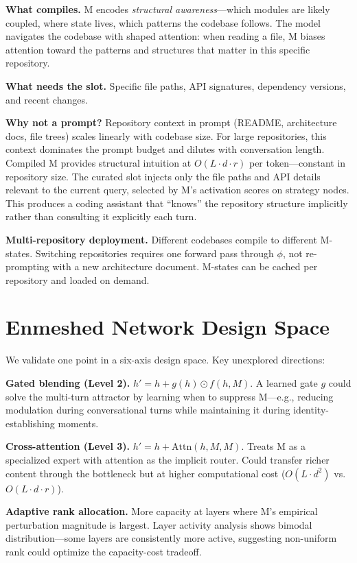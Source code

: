 \textbf{What compiles.} M encodes \emph{structural awareness}---which modules are likely coupled, where state lives, which patterns the codebase follows. The model navigates the codebase with shaped attention: when reading a file, M biases attention toward the patterns and structures that matter in this specific repository.

\textbf{What needs the slot.} Specific file paths, API signatures, dependency versions, and recent changes.

\textbf{Why not a prompt?} Repository context in prompt (README, architecture docs, file trees) scales linearly with codebase size. For large repositories, this context dominates the prompt budget and dilutes with conversation length. Compiled M provides structural intuition at $O(L \cdot d \cdot r)$ per token---constant in repository size. The curated slot injects only the file paths and API details relevant to the current query, selected by M's activation scores on strategy nodes. This produces a coding assistant that ``knows'' the repository structure implicitly rather than consulting it explicitly each turn.

\textbf{Multi-repository deployment.} Different codebases compile to different M-states. Switching repositories requires one forward pass through $\phi$, not re-prompting with a new architecture document. M-states can be cached per repository and loaded on demand.

\section{Enmeshed Network Design Space}
\label{sec:full_design_space}

We validate one point in a six-axis design space. Key unexplored directions:

\textbf{Gated blending (Level 2).} $h' = h + g(h) \odot f(h, M)$. A learned gate $g$ could solve the multi-turn attractor by learning when to suppress M---e.g., reducing modulation during conversational turns while maintaining it during identity-establishing moments.

\textbf{Cross-attention (Level 3).} $h' = h + \text{Attn}(h, M, M)$. Treats M as a specialized expert with attention as the implicit router. Could transfer richer content through the bottleneck but at higher computational cost ($O(L \cdot d^2)$ vs.\ $O(L \cdot d \cdot r)$).

\textbf{Adaptive rank allocation.} More capacity at layers where M's empirical perturbation magnitude is largest. Layer activity analysis shows bimodal distribution---some layers are consistently more active, suggesting non-uniform rank could optimize the capacity-cost tradeoff.

